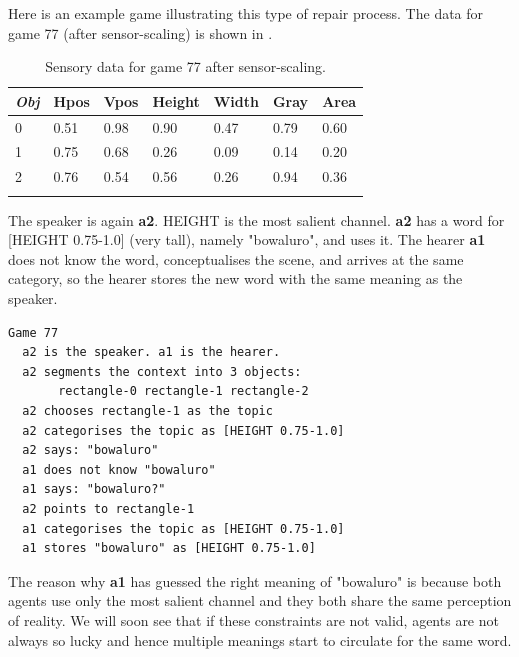 Here is an example game illustrating this
type of repair process. 
The data for game 77 (after sensor-scaling)
is shown in . 
\begin{table}
\begin{center}
\begin{tabular}{ l  l  l  l  l  l  l }
\lsptoprule
{\it Obj} & Hpos & Vpos & Height & Width & Gray & Area \\ \midrule
0 & 0.51 & 0.98 & 0.90 & 0.47 & 0.79 & 0.60\\ \midrule
1 & 0.75 & 0.68 & 0.26 & 0.09 & 0.14 & 0.20\\ \midrule
2 & 0.76 & 0.54 & 0.56 & 0.26 & 0.94 & 0.36\\ \midrule
\lspbottomrule
\end{tabular}
\caption{\label{tab:game77} Sensory data for game 77 after sensor-scaling.}
\end{center}
\end{table}
The speaker is again {\bf a2}. HEIGHT is the most salient channel. 
{\bf a2} has a word for [HEIGHT 0.75-1.0] (very tall), namely
"bowaluro", and uses it. The hearer {\bf a1} 
does not know the 
word, conceptualises the scene, and arrives at the 
same category, so the hearer stores the new word
with the same meaning as the speaker. 
\begin{verbatim}
Game 77
  a2 is the speaker. a1 is the hearer. 
  a2 segments the context into 3 objects: 
       rectangle-0 rectangle-1 rectangle-2
  a2 chooses rectangle-1 as the topic 
  a2 categorises the topic as [HEIGHT 0.75-1.0]
  a2 says: "bowaluro"
  a1 does not know "bowaluro"
  a1 says: "bowaluro?"
  a2 points to rectangle-1
  a1 categorises the topic as [HEIGHT 0.75-1.0]
  a1 stores "bowaluro" as [HEIGHT 0.75-1.0]
\end{verbatim}
The reason why {\bf a1} has guessed the right 
meaning of "bowaluro" is because both agents use
only the most salient channel and they both share
the same perception of reality. We will soon see 
that if these constraints are not valid, agents 
are not always so lucky and hence multiple meanings
start to circulate for the same word. 

